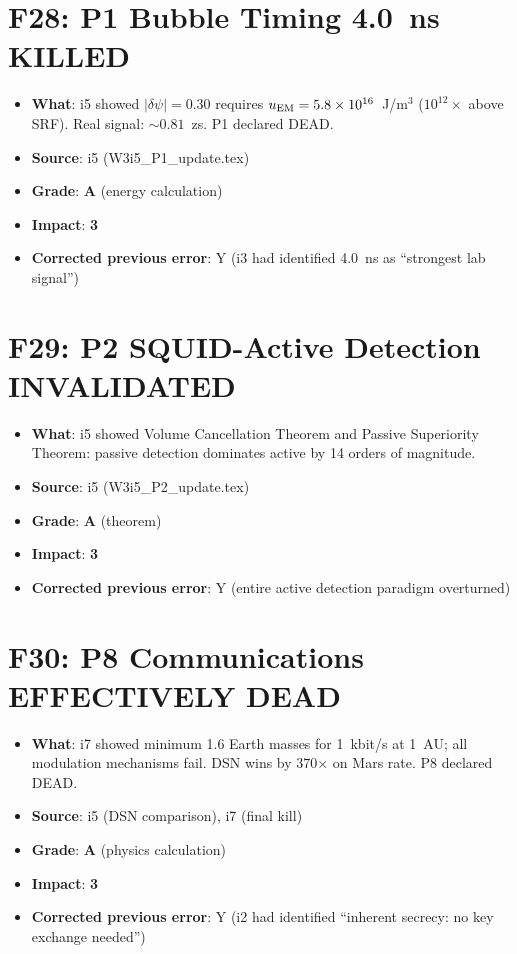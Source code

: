 \documentclass[11pt,a4paper]{article}
\newcommand{\grade}[1]{\textbf{#1}}
\newcommand{\impact}[1]{\textbf{#1}}
\begin{document}
\section{F28: P1 Bubble Timing 4.0~ns KILLED}
\begin{itemize}[nosep]
\item \textbf{What}: i5 showed $|\delta\psi| = 0.30$ requires $u_{\rm EM} = 5.8 \times 10^{16}$~J/m$^3$ ($10^{12}\times$ above SRF). Real signal: $\sim 0.81$~zs. P1 declared DEAD.
\item \textbf{Source}: i5 (W3i5\_P1\_update.tex)
\item \textbf{Grade}: \grade{A} (energy calculation)
\item \textbf{Impact}: \impact{3}
\item \textbf{Corrected previous error}: Y (i3 had identified 4.0~ns as ``strongest lab signal'')
\end{itemize}

\section{F29: P2 SQUID-Active Detection INVALIDATED}
\begin{itemize}[nosep]
\item \textbf{What}: i5 showed Volume Cancellation Theorem and Passive Superiority Theorem: passive detection dominates active by 14 orders of magnitude.
\item \textbf{Source}: i5 (W3i5\_P2\_update.tex)
\item \textbf{Grade}: \grade{A} (theorem)
\item \textbf{Impact}: \impact{3}
\item \textbf{Corrected previous error}: Y (entire active detection paradigm overturned)
\end{itemize}

\section{F30: P8 Communications EFFECTIVELY DEAD}
\begin{itemize}[nosep]
\item \textbf{What}: i7 showed minimum 1.6 Earth masses for 1~kbit/s at 1~AU; all modulation mechanisms fail. DSN wins by 370$\times$ on Mars rate. P8 declared DEAD.
\item \textbf{Source}: i5 (DSN comparison), i7 (final kill)
\item \textbf{Grade}: \grade{A} (physics calculation)
\item \textbf{Impact}: \impact{3}
\item \textbf{Corrected previous error}: Y (i2 had identified ``inherent secrecy: no key exchange needed'')
\end{itemize}
\end{document}
